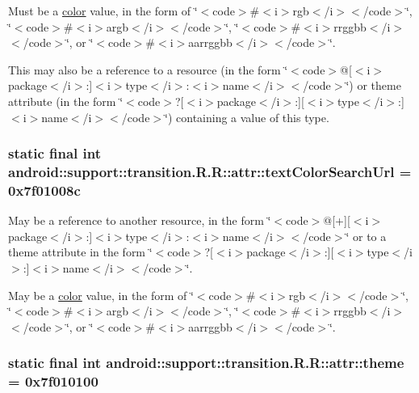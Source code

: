 Must be a \hyperlink{classandroid_1_1support_1_1transition_1_1_r_1_1color}{color} value, in the form of \char`\"{}$<$code$>$\#$<$i$>$rgb$<$/i$>$$<$/code$>$\char`\"{}, \char`\"{}$<$code$>$\#$<$i$>$argb$<$/i$>$$<$/code$>$\char`\"{}, \char`\"{}$<$code$>$\#$<$i$>$rrggbb$<$/i$>$$<$/code$>$\char`\"{}, or \char`\"{}$<$code$>$\#$<$i$>$aarrggbb$<$/i$>$$<$/code$>$\char`\"{}. 

This may also be a reference to a resource (in the form \char`\"{}$<$code$>$@\mbox{[}$<$i$>$package$<$/i$>$:\mbox{]}$<$i$>$type$<$/i$>$:$<$i$>$name$<$/i$>$$<$/code$>$\char`\"{}) or theme attribute (in the form \char`\"{}$<$code$>$?\mbox{[}$<$i$>$package$<$/i$>$:\mbox{]}\mbox{[}$<$i$>$type$<$/i$>$:\mbox{]}$<$i$>$name$<$/i$>$$<$/code$>$\char`\"{}) containing a value of this type. \hypertarget{classandroid_1_1support_1_1transition_1_1_r_1_1attr_f202e00f41259b7746d6cfac4df74b7d}{
\subsubsection[{textColorSearchUrl}]{\setlength{\rightskip}{0pt plus 5cm}static final int android::support::transition.R.R::attr::textColorSearchUrl = 0x7f01008c}}
\label{classandroid_1_1support_1_1transition_1_1_r_1_1attr_f202e00f41259b7746d6cfac4df74b7d}


May be a reference to another resource, in the form \char`\"{}$<$code$>$@\mbox{[}+\mbox{]}\mbox{[}$<$i$>$package$<$/i$>$:\mbox{]}$<$i$>$type$<$/i$>$:$<$i$>$name$<$/i$>$$<$/code$>$\char`\"{} or to a theme attribute in the form \char`\"{}$<$code$>$?\mbox{[}$<$i$>$package$<$/i$>$:\mbox{]}\mbox{[}$<$i$>$type$<$/i$>$:\mbox{]}$<$i$>$name$<$/i$>$$<$/code$>$\char`\"{}. 

May be a \hyperlink{classandroid_1_1support_1_1transition_1_1_r_1_1color}{color} value, in the form of \char`\"{}$<$code$>$\#$<$i$>$rgb$<$/i$>$$<$/code$>$\char`\"{}, \char`\"{}$<$code$>$\#$<$i$>$argb$<$/i$>$$<$/code$>$\char`\"{}, \char`\"{}$<$code$>$\#$<$i$>$rrggbb$<$/i$>$$<$/code$>$\char`\"{}, or \char`\"{}$<$code$>$\#$<$i$>$aarrggbb$<$/i$>$$<$/code$>$\char`\"{}. \hypertarget{classandroid_1_1support_1_1transition_1_1_r_1_1attr_cc2da7fd1b8a1a2d6c67e8bafcbd17e9}{
\subsubsection[{theme}]{\setlength{\rightskip}{0pt plus 5cm}static final int android::support::transition.R.R::attr::theme = 0x7f010100}}
\label{classandroid_1_1support_1_1transition_1_1_r_1_1attr_cc2da7fd1b8a1a2d6c67e8bafcbd17e9}


